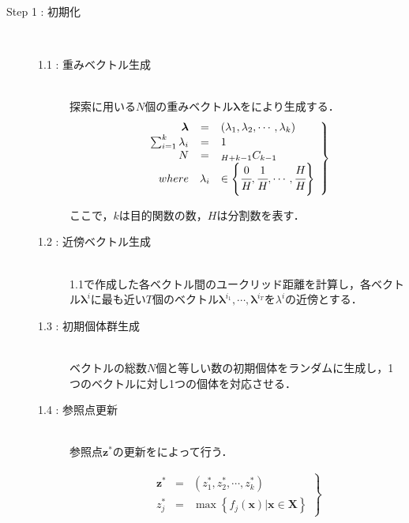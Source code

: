 \documentclass[../main/main]{subfiles}
\begin{document}
\begin{description}
\item[Step 1 : 初期化]\mbox{}\\
\vspace{-0.5in}
	\begin{description}
	\item[1.1 : 重みベクトル生成]\mbox{}\\
	探索に用いる$N$個の重みベクトル${\bm \lambda}$をにより生成する．
	\begin{eqnarray}
	\left.
	\begin{array}{rcl}
	{\bm \lambda} & = & (\lambda_1, \lambda_2, \cdots, \lambda_k)\\
	\sum_{i=1}^{k} \lambda_i & = & 1\\
	N & = & {}_{H+k-1}C_{k-1}\\
	where & \lambda_i & \in \left\{ \cfrac{0}{H}, \cfrac{1}{H}, \cdots, \cfrac{H}{H} \right\}
	\end{array}
	\right\}
	\label{omomi}
	\end{eqnarray}
	
	ここで，$k$は目的関数の数，$H$は分割数を表す．
	
	
	\item[1.2 : 近傍ベクトル生成]\mbox{}\\
	1.1で作成した各ベクトル間のユークリッド距離を計算し，各ベクトル$\bm \lambda^i$に最も近い$T$個のベクトル$\bm \lambda^{i_1}, \cdots, \bm \lambda^{i_T}$を$\lambda^i$の近傍とする．
	
	\item[1.3 : 初期個体群生成]\mbox{}\\
	ベクトルの総数$N$個と等しい数の初期個体をランダムに生成し，1つのベクトルに対し1つの個体を対応させる．
	
	\item[1.4 : 参照点更新]\mbox{}\\
	参照点$\bm z^*$の更新をによって行う．
	
	\begin{eqnarray}
	\left.
	\begin{array}{rcl}
	{\bm z^*} & = & (z_1^*, z_2^*, \cdots, z_k^*)\\
	z^*_j & = & \max \left\{ f_j (\bm x) | \bm x \in \bm X \right\}
	\end{array}
	\right\}
	\label{sansyou}
	\end{eqnarray}
	

\end{description}
\end{description}
\end{document}
